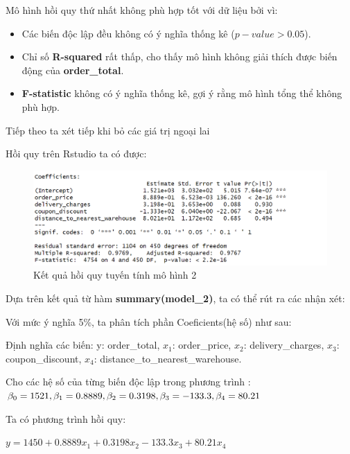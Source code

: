 Mô hình hồi quy thứ nhất không phù hợp tốt với dữ liệu bởi vì:
\begin{itemize}
\item Các biến độc lập đều không có ý nghĩa thống kê ($p-value > 0.05$).
\item Chỉ số \textbf{R-squared} rất thấp, cho thấy mô hình không giải thích được biến động của \textbf{order\_total}.
\item\textbf{F-statistic} không có ý nghĩa thống kê, gợi ý rằng mô hình tổng thể không phù hợp.
\end{itemize}

Tiếp theo ta xét tiếp khi bỏ các giá trị ngoại lai

Hồi quy trên Rstudio ta có được:
\begin{figure}[H]
  \centering
  \includegraphics[width=0.7\linewidth]{graphics/5.5.3.png}
  \caption{Kết quả hồi quy tuyến tính mô hình 2 }
\end{figure} 

Dựa trên kết quả từ hàm \textbf{summary(model\_2)}, ta có thể rút ra các nhận xét:

Với mức ý nghĩa 5\%, ta phân tích phần Coeficients(hệ số) như sau:

Định nghĩa các biến:  y: order\_total, $x_1$: order\_price, $x_2$: delivery\_charges, $x_3$: coupon\_discount, $x_4$: distance\_to\_nearest\_warehouse.

Cho các hệ số của từng biến độc lập trong phương trình : $\beta_0= 1521, \beta_1= 0.8889, \\\beta_2= 0.3198, \beta_3= -133.3, \beta_4= 80.21$ 

Ta có phương trình hồi quy: 

 \hspace{25mm}$y= 1450 + 0.8889x_1 + 0.3198x_2 - 133.3x_3 + 80.21x_4$

